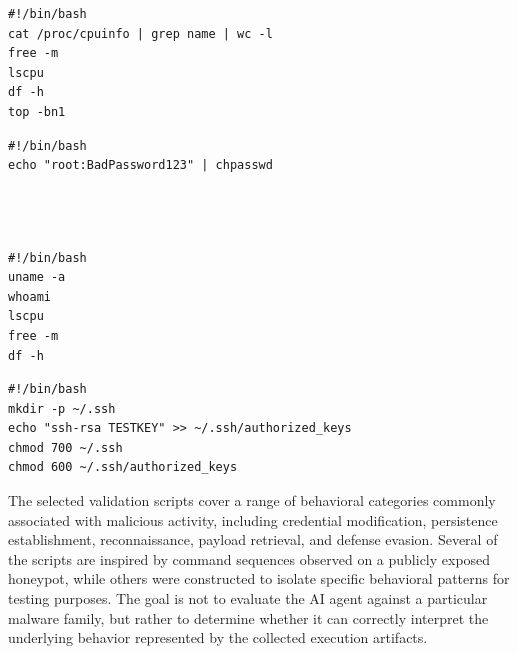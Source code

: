 \begin{minipage}[t][3.0cm][t]{0.45\textwidth}
\vspace{-6mm}
\begin{verbatim}
#!/bin/bash
cat /proc/cpuinfo | grep name | wc -l
free -m
lscpu
df -h
top -bn1
\end{verbatim}
\end{minipage}
\hfill
\begin{minipage}[t][3.0cm][t]{0.45\textwidth}
\vspace{-6mm}
\begin{verbatim}
#!/bin/bash
echo "root:BadPassword123" | chpasswd




\end{verbatim}
\end{minipage}

\vspace{1em}

\begin{minipage}[t][3.0cm][t]{0.45\textwidth}
\vspace{-6mm}
\begin{verbatim}
#!/bin/bash
uname -a
whoami
lscpu
free -m
df -h
\end{verbatim}
\end{minipage}
\hfill
\begin{minipage}[t][3.0cm][t]{0.45\textwidth}
\vspace{-6mm}
\begin{verbatim}
#!/bin/bash
mkdir -p ~/.ssh
echo "ssh-rsa TESTKEY" >> ~/.ssh/authorized_keys
chmod 700 ~/.ssh
chmod 600 ~/.ssh/authorized_keys

\end{verbatim}
\end{minipage}

\vspace{1em}

\vspace{1em}

The selected validation scripts cover a range of behavioral categories commonly associated with malicious activity, including credential modification, persistence establishment, reconnaissance, payload retrieval, and defense evasion. Several of the scripts are inspired by command sequences observed on a publicly exposed honeypot, while others were constructed to isolate specific behavioral patterns for testing purposes. The goal is not to evaluate the AI agent against a particular malware family, but rather to determine whether it can correctly interpret the underlying behavior represented by the collected execution artifacts.

